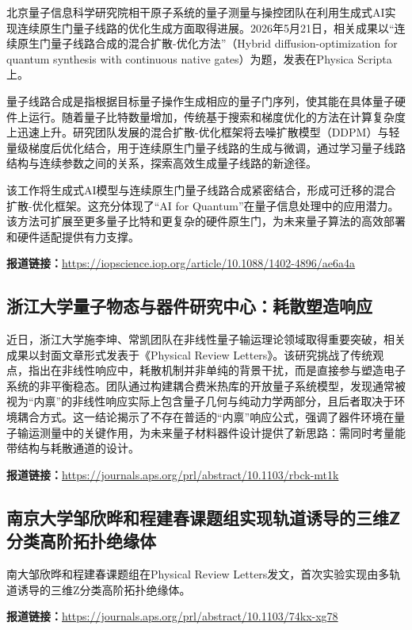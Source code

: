 \documentclass[12pt,a4paper]{ctexart}
\begin{document}
北京量子信息科学研究院相干原子系统的量子测量与操控团队在利用生成式AI实现连续原生门量子线路的优化生成方面取得进展。2026年5月21日，相关成果以“连续原生门量子线路合成的混合扩散-优化方法”（Hybrid diffusion-optimization for quantum synthesis with continuous native gates）为题，发表在Physica Scripta上。

量子线路合成是指根据目标量子操作生成相应的量子门序列，使其能在具体量子硬件上运行。随着量子比特数量增加，传统基于搜索和梯度优化的方法在计算复杂度上迅速上升。研究团队发展的混合扩散-优化框架将去噪扩散模型（DDPM）与轻量级梯度后优化结合，用于连续原生门量子线路的生成与微调，通过学习量子线路结构与连续参数之间的关系，探索高效生成量子线路的新途径。

该工作将生成式AI模型与连续原生门量子线路合成紧密结合，形成可迁移的混合扩散-优化框架。这充分体现了“AI for Quantum”在量子信息处理中的应用潜力。该方法可扩展至更多量子比特和更复杂的硬件原生门，为未来量子算法的高效部署和硬件适配提供有力支撑。

\noindent\textbf{报道链接：}\url{https://iopscience.iop.org/article/10.1088/1402-4896/ae6a4a }

\subsection{ 浙江大学量子物态与器件研究中心：耗散塑造响应 }

近日，浙江大学施李坤、常凯团队在非线性量子输运理论领域取得重要突破，相关成果以封面文章形式发表于《Physical Review Letters》。该研究挑战了传统观点，指出在非线性响应中，耗散机制并非单纯的背景干扰，而是直接参与塑造电子系统的非平衡稳态。团队通过构建耦合费米热库的开放量子系统模型，发现通常被视为“内禀”的非线性响应实际上包含量子几何与纯动力学两部分，且后者取决于环境耦合方式。这一结论揭示了不存在普适的“内禀”响应公式，强调了器件环境在量子输运测量中的关键作用，为未来量子材料器件设计提供了新思路：需同时考量能带结构与耗散通道的设计。

\noindent\textbf{报道链接：}\url{https://journals.aps.org/prl/abstract/10.1103/rbck-mt1k }

\subsection{ 南京大学邹欣晔和程建春课题组实现轨道诱导的三维ℤ分类高阶拓扑绝缘体 }

南大邹欣晔和程建春课题组在Physical Review Letters发文，首次实验实现由多轨道诱导的三维Z分类高阶拓扑绝缘体。

\noindent\textbf{报道链接：}\url{https://journals.aps.org/prl/abstract/10.1103/74kx-xg78 }
\end{document}
